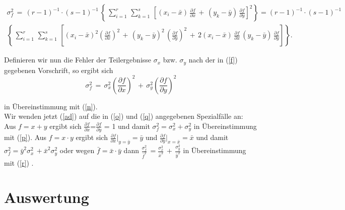 \begin{eqnarray} \label{ae}
\sigma_{f}^{2}\,=\,(r-1)^{-1}\cdot
(s-1)^{-1}\,\left\{\,\sum_{i=1}^{r}\,\sum_{k=1}^{s}\,\left[(x_{i}-\bar
x)\,\frac{\partial f}{\partial x}\,+\,(y_{k}-\bar y)\,\frac{\partial
 f}{\partial y}\right]^{2}\right\}
=(r-1)^{-1}\cdot
(s-1)^{-1} \nonumber\\
\left\{\,\sum_{i=1}^{r}\,\sum_{k=1}^{s}\,\left[(x_{i}-\bar
x)^{2} \left(\frac{\partial f}{\partial x}\right)^{2}\,+\,(y_{k}-\bar
y)^{2}\,\left(\frac{\partial f}{\partial y}\right)^{2}\,+\,2(x_{i}-\bar
x)\,\frac{\partial f}{\partial x}\,(y_{k}-\bar y)\,\frac{\partial f}{\partial
  y}\right]\right\}.
\end{eqnarray}

Definieren wir nun die Fehler der Teilergebnisse $\sigma_x$
bzw. $\sigma_y$ nach der in (\ref{f}) gegebenen Vorschrift, so ergibt
sich\\

\begin{equation} \label{af}
\sigma_{f}^{2}\,=\,\sigma_{x}^{2}\left(\frac{\partial f}{\partial
 x}\right)^{2}\,+\,\sigma_{y}^{2}\left(\frac{\partial f}{\partial
 y}\right)^{2}
 \end{equation}

in Übereinstimmung mit (\ref{n}).\\


Wir wenden jetzt (\ref{ad}) auf die in (\ref{o}) und (\ref{q}) angegebenen
Spezialfälle an:\\



Aus $f = x+y$ ergibt sich $\frac{\partial f}{\partial x}$=$\frac{\partial
 f}{\partial y}$ = 1 und damit
$\sigma_{f}^{2}=\sigma_{x}^{2}+\sigma_{y}^{2}$ in Übereinstimmung mit
(\ref{p}). Aus $f=x\cdot y$ ergibt sich $\frac{\partial
  f}{\partial x}|_{y=\bar y}=\bar y$ und $\frac{\partial f}{\partial y}|_{x=\bar x}=\bar x$ und damit
$\sigma_{f}^{2}=\bar y^{2} \sigma_{x}^{2}\,+\bar x^{2}
\sigma_{y}^{2}$ oder wegen $\bar f = \bar x \cdot\bar y$ dann
$\frac{\sigma_{f}^{2}}{\bar f^{2}}\,=\frac{\sigma_{x}^{2}}{\bar
 x^{2}}\,+\,\frac{\sigma_{y}^{2}}{\bar y^{2}}$
in Übereinstimmung mit (\ref{r}) .\\





\section{Auswertung}

